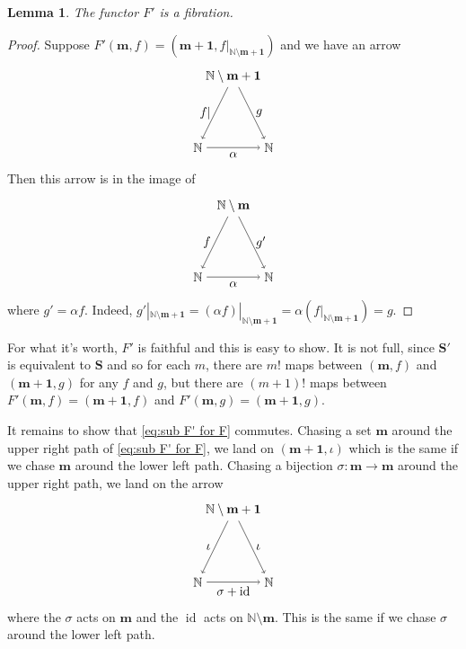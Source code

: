\documentclass[11pt]{amsart}
\newcommand{\NN}{\mathbb{N}}
\newcommand{\cat}[1]{\mathbf{#1}}
\newcommand{\from}{\colon}
\DeclareMathOperator{\id}{id}
\newtheorem{lem}[thm]{Lemma}
\theoremstyle{remark}
\theoremstyle{definition}
\begin{document}
\begin{lem}
	The functor $F'$ is a fibration.
\end{lem}
\begin{proof}
	Suppose $F'(\mathbf{m},f)=(\mathbf{m+1},f|_{\NN \setminus \mathbf{m+1}})$ and we have an arrow
	\[
	\begin{tikzpicture}
		\node (1) at (0,2) {$\NN \setminus \mathbf{m+1}$};
		\node (2) at (-1,0) {$\NN$};
		\node (3) at (1,0) {$\NN$};
		\draw [->] (1) to node[left] {$f|$} (2);
		\draw [->] (1) to node[right] {$g$} (3);
		\draw [->] (2) to node[below] {$\alpha$} (3);
	\end{tikzpicture}
	\]
Then this arrow is in the image of 
	\[
	\begin{tikzpicture}
		\node (1) at (0,2) {$\NN \setminus \mathbf{m}$};
		\node (2) at (-1,0) {$\NN$};
		\node (3) at (1,0) {$\NN$};
		\draw [->] (1) to node[left] {$f$} (2);
		\draw [->] (1) to node[right] {$g'$} (3);
		\draw [->] (2) to node[below] {$\alpha$} (3);
	\end{tikzpicture}
	\]
where $g' = \alpha f$.  Indeed, $g'|_{\NN \setminus \mathbf{m+1}} = (\alpha f)|_{\NN \setminus \mathbf{m+1}} = \alpha (f|_{\NN \setminus \mathbf{m+1}}) = g$.  
\end{proof}

For what it's worth, $F'$ is faithful and this is easy to show.  It is not full, since $\cat{S}'$ is equivalent to $\cat{S}$ and so for each $m$, there are $m!$ maps between $(\mathbf{m},f)$ and $(\mathbf{m+1},g)$ for any $f$ and $g$, but there are $(m+1)!$ maps between $F'(\mathbf{m},f)=(\mathbf{m+1},f)$ and $F'(\mathbf{m},g)=(\mathbf{m+1},g)$.  

It remains to show that \eqref{eq:sub F' for F} commutes.  Chasing a set $\mathbf{m}$ around the upper right path of \eqref{eq:sub F' for F}, we land on $(\mathbf{m+1},\iota)$ which is the same if we chase $\mathbf{m}$ around the lower left path.  Chasing a bijection $\sigma \from \mathbf{m} \to \mathbf{m}$ around the upper right path, we land on the arrow
\[
\begin{tikzpicture}
	\node (1) at (0,2) {$\NN \setminus \mathbf{m+1}$};
	\node (2) at (-1,0) {$\NN$};
	\node (3) at (1,0) {$\NN$};
	\draw [->] (1) to node[left] {$\iota$} (2);
	\draw [->] (1) to node[right] {$\iota$} (3);
	\draw [->] (2) to node[below] {$\sigma + \id$} (3);
\end{tikzpicture}
\]
where the $\sigma$ acts on $\mathbf{m}$ and the $\id$ acts on $\NN \setminus \mathbf{m}$.  This is the same if we chase $\sigma$ around the lower left path.
\end{document}
